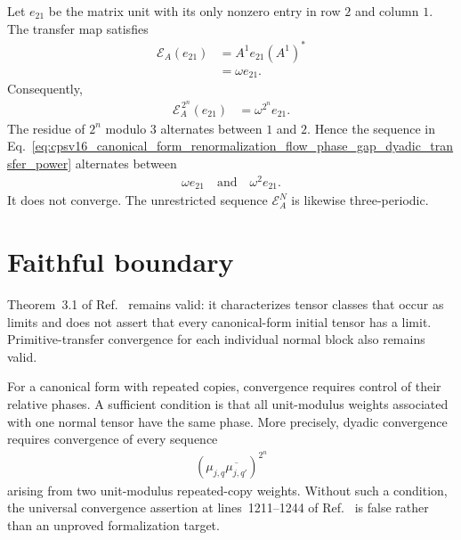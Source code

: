 \documentclass{article}
\begin{document}
Let $e_{21}$ be the matrix unit with its only nonzero entry in row $2$ and
column $1$. The transfer map satisfies
\begin{align}
    \mathcal E_A(e_{21})
        &=
    A^1e_{21}(A^1)^*
    \label{eq:cpsv16_canonical_form_renormalization_flow_phase_gap_transfer_action_expansion}\\
        &=
    \omega e_{21}.
    \label{eq:cpsv16_canonical_form_renormalization_flow_phase_gap_transfer_eigenvalue}
\end{align}
Consequently,
\begin{align}
    \mathcal E_A^{\,2^n}(e_{21})
        &=
    \omega^{2^n}e_{21}.
    \label{eq:cpsv16_canonical_form_renormalization_flow_phase_gap_dyadic_transfer_power}
\end{align}
The residue of $2^n$ modulo $3$ alternates between $1$ and $2$. Hence the
sequence in
Eq.~\ref{eq:cpsv16_canonical_form_renormalization_flow_phase_gap_dyadic_transfer_power}
alternates between
\begin{align}
    \omega e_{21}
        \quad\text{and}\quad
    \omega^2e_{21}.
    \label{eq:cpsv16_canonical_form_renormalization_flow_phase_gap_alternating_values}
\end{align}
It does not converge. The unrestricted sequence $\mathcal E_A^N$ is likewise
three-periodic.

\section{Faithful boundary}

Theorem~3.1 of Ref.~\cite{Cirac2016MPDO_arXiv} remains valid: it characterizes
tensor classes that occur as limits and does not assert that every
canonical-form initial tensor has a limit. Primitive-transfer convergence for
each individual normal block also remains valid.

For a canonical form with repeated copies, convergence requires control of
their relative phases. A sufficient condition is that all unit-modulus weights
associated with one normal tensor have the same phase. More precisely, dyadic
convergence requires convergence of every sequence
\begin{align}
    \left(\mu_{j,q}\overline{\mu_{j,q'}}\right)^{2^n}
    \label{eq:cpsv16_canonical_form_renormalization_flow_phase_gap_relative_phase_sequence}
\end{align}
arising from two unit-modulus repeated-copy weights. Without such a condition,
the universal convergence assertion at lines~1211--1244 of
Ref.~\cite{Cirac2016MPDO_arXiv} is false rather than an unproved
formalization target.
\end{document}
